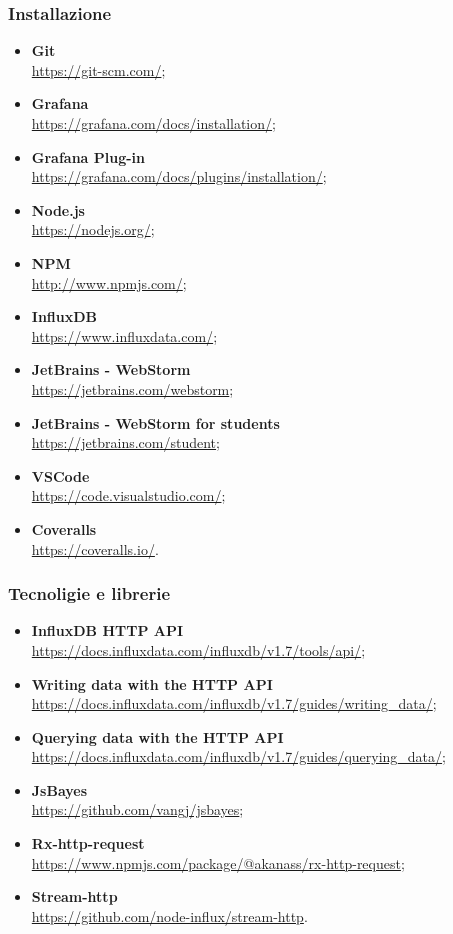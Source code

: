 \subsubsection{Installazione}
\begin{itemize}
	\item{\textbf{Git}\\
		\url{https://git-scm.com/}};
	\item{\textbf{Grafana}\\
		\url{https://grafana.com/docs/installation/}};
	\item{\textbf{Grafana Plug-in}\\
		\url{https://grafana.com/docs/plugins/installation/}};
	\item{\textbf{Node.js}\\
		\url{https://nodejs.org/}};
	\item{\textbf{NPM}\\
		\url{http://www.npmjs.com/}};
	\item{\textbf{InfluxDB}\\
		\url{https://www.influxdata.com/}};
	\item{\textbf{JetBrains - WebStorm}\\
		\url{https://jetbrains.com/webstorm}};
	\item{\textbf{JetBrains - WebStorm for students}\\
		\url{https://jetbrains.com/student}};
	\item{\textbf{VSCode}\\
		\url{https://code.visualstudio.com/}};
	\item{\textbf{Coveralls}\\
		\url{https://coveralls.io/}}.
\end{itemize}

\subsubsection{Tecnoligie e librerie}
\begin{itemize}
	\item{\textbf{InfluxDB HTTP API}\\
		\url{https://docs.influxdata.com/influxdb/v1.7/tools/api/}};
	\item{\textbf{Writing data with the HTTP API}\\
		\url{https://docs.influxdata.com/influxdb/v1.7/guides/writing_data/}};
	\item{\textbf{Querying data with the HTTP API}\\
		\url{https://docs.influxdata.com/influxdb/v1.7/guides/querying_data/}};
	\item{\textbf{JsBayes}\\
		\url{https://github.com/vangj/jsbayes}};
	\item{\textbf{Rx-http-request}\\
		\url{https://www.npmjs.com/package/@akanass/rx-http-request}};
	\item{\textbf{Stream-http}\\
		\url{https://github.com/node-influx/stream-http}}.
\end{itemize}

